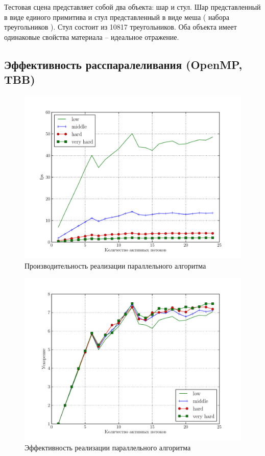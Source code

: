 \documentclass[12pt, a4paper, utf8]{article}
\begin{document}
Тестовая сцена представляет собой два объекта: шар и стул. Шар представленный в виде единого примитива и стул представленный в виде меша ( набора треугольников ). Стул состоит из 10817 треугольников. Оба объекта имеет одинаковые свойства материала -- идеальное отражение. 

\subsection{Эффективность расспаралеливания (OpenMP, TBB)}



\begin{figure}[H]
\centering
\includegraphics[width=\textwidth]{perf/table_perf.pdf}
\caption{Производительность реализации параллельного алгоритма}\label{fig:perf_parallel_alg}
\end{figure}

\begin{figure}[H]
\centering
\includegraphics[width=\textwidth]{perf/table_perf_eff.pdf}
\caption{Эффективность реализации параллельного алгоритма}\label{fig:eff_parallel_alg}
\end{figure}
\end{document}
